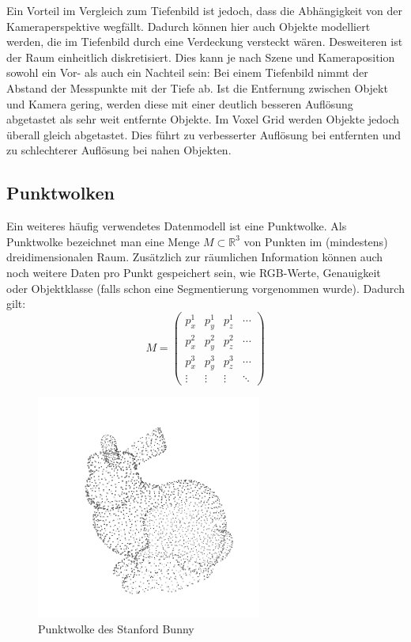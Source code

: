 Ein Vorteil im Vergleich zum Tiefenbild ist jedoch, dass die Abhängigkeit von der Kameraperspektive wegfällt.
Dadurch können hier auch Objekte modelliert werden, die im Tiefenbild durch eine Verdeckung versteckt wären.
Desweiteren ist der Raum einheitlich diskretisiert.
Dies kann je nach Szene und Kameraposition sowohl ein Vor- als auch ein Nachteil sein:
Bei einem Tiefenbild nimmt der Abstand der Messpunkte mit der Tiefe ab.
Ist die Entfernung zwischen Objekt und Kamera gering, werden diese mit einer deutlich besseren Auflösung abgetastet als sehr weit entfernte Objekte.
Im Voxel Grid werden Objekte jedoch überall gleich abgetastet.
Dies führt zu verbesserter Auflösung bei entfernten und zu schlechterer Auflösung bei nahen Objekten.


\subsection{Punktwolken}
\label{subsec:punktwolken}

Ein weiteres häufig verwendetes Datenmodell ist eine Punktwolke.
Als Punktwolke bezeichnet man eine Menge $M \subset \mathbb{R}^3$ von Punkten im (mindestens) dreidimensionalen Raum.
Zusätzlich zur räumlichen Information können auch noch weitere Daten pro Punkt gespeichert sein, wie RGB-Werte, Genauigkeit oder Objektklasse (falls schon eine Segmentierung vorgenommen wurde).
Dadurch gilt:
$$M = \begin{pmatrix}
p_x^1 & p_y^1 & p_z^1 & \cdots\\
p_x^2 & p_y^2 & p_z^2 & \cdots\\
p_x^3 & p_y^3 & p_z^3 & \cdots\\
\vdots & \vdots & \vdots & \ddots
\end{pmatrix}$$

\begin{figure}[ht]
	\centering
	\includegraphics[width=0.66\textwidth, frame]{images/bunny_pcd.png}
	\caption{Punktwolke des Stanford Bunny \cite{stanfordbunny}}
	\label{fig:bunny_pcd}
\end{figure}

